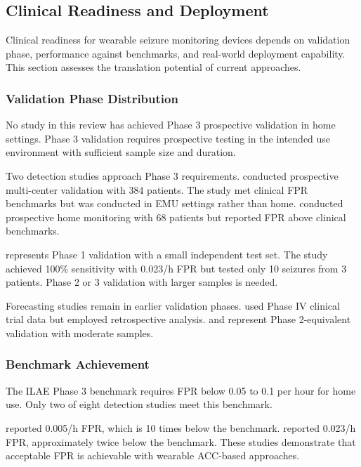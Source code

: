 \subsection{Clinical Readiness and Deployment}

Clinical readiness for wearable seizure monitoring devices depends on validation phase, performance against benchmarks, and real-world deployment capability. This section assesses the translation potential of current approaches.

\subsubsection{Validation Phase Distribution}

No study in this review has achieved Phase 3 prospective validation in home settings. Phase 3 validation requires prospective testing in the intended use environment with sufficient sample size and duration.

Two detection studies approach Phase 3 requirements. \textcite{spahrDeepLearningbasedDetection2025} conducted prospective multi-center validation with 384 patients. The study met clinical FPR benchmarks but was conducted in EMU settings rather than home. \textcite{dongTwoLayerEnsembleMethod2022} conducted prospective home monitoring with 68 patients but reported FPR above clinical benchmarks.

\textcite{fineWearableDeviceSeizure2025} represents Phase 1 validation with a small independent test set. The study achieved 100\% sensitivity with 0.023/h FPR but tested only 10 seizures from 3 patients. Phase 2 or 3 validation with larger samples is needed.

Forecasting studies remain in earlier validation phases. \textcite{vielufSeizureMonitoringCombined2025} used Phase IV clinical trial data but employed retrospective analysis. \textcite{meiselMachineLearningWristband2020} and \textcite{nasseriAmbulatorySeizureForecasting2021} represent Phase 2-equivalent validation with moderate samples.

\subsubsection{Benchmark Achievement}

The ILAE Phase 3 benchmark requires FPR below 0.05 to 0.1 per hour for home use. Only two of eight detection studies meet this benchmark.

\textcite{spahrDeepLearningbasedDetection2025} reported 0.005/h FPR, which is 10 times below the benchmark. \textcite{fineWearableDeviceSeizure2025} reported 0.023/h FPR, approximately twice below the benchmark. These studies demonstrate that acceptable FPR is achievable with wearable ACC-based approaches.

